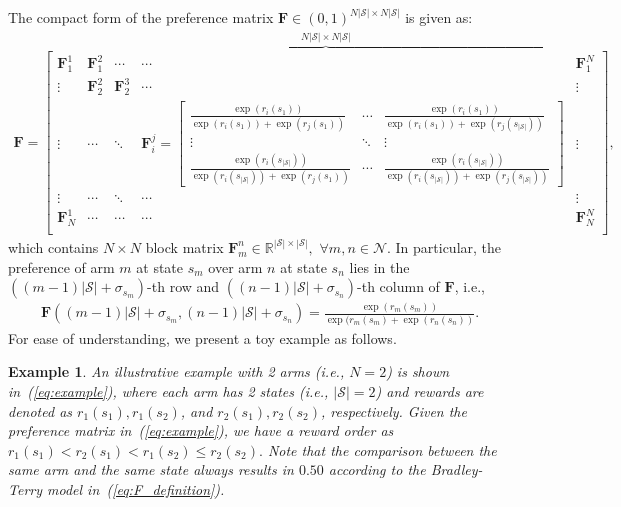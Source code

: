 \documentclass{article} %
\newcommand{\bF}{\mathbf{F}}
\newcommand{\cS}{\mathcal{S}}
\newcommand{\cN}{\mathcal{N}}
\newtheorem{exmp}{Example}
\begin{document}
{The compact form of the preference matrix $\bF\in(0,1)^{N|\cS|\times N|\cS|}$ is given as:
\begin{align*}
 \bF\!=\!  \overset{N|\cS|\times N|\cS|}{\overbrace{\left[\!\!
\begin{array}{c|c|c|c|c}
  \bF_1^1
        & \bF_1^2 &\cdots & \cdots & \bF_1^N\\
    \vdots & \bF_2^2 & \bF_2^3& \cdots & \vdots \\
     \vdots & \cdots &  \ddots & \bF_i^j\!=\!\left[\!\!\begin{array}{ccc}
         \frac{\exp(r_i(s_{1}))}{\exp(r_i(s_{1}))+\exp(r_j(s_{1}))}& \cdots &\frac{\exp(r_i(s_{1}))}{\exp(r_i(s_{1}))+\exp(r_j(s_{|\cS|}))} \\
         \vdots& \ddots & \vdots\\
         \frac{\exp(r_i(s_{|\cS|}))}{\exp(r_i(s_{|\cS|}))+\exp(r_j(s_{1}))}& \cdots& \frac{\exp(r_i(s_{|\cS|}))}{\exp(r_i(s_{|\cS|}))+\exp(r_j(s_{|\cS|}))}
    \end{array}\!\!\right] & \vdots \\
    \vdots& \cdots & \ddots & \cdots & \vdots \\
  \bF_N^1  & \cdots & \cdots & \cdots & \bF_{N}^N \\
\end{array}
\!\!\right] }},
\end{align*}
which contains $N\times N$ block matrix $\bF_m^n\in\mathbb{R}^{|\cS|\times|\cS|},$ $\forall m, n \in \cN$. In particular, the preference of arm $m$ at state $s_m$ over arm $n$ at state $s_n$ lies in the $((m-1)|\cS|+\sigma_{s_m})$-th row and $((n-1)|\cS|+\sigma_{s_n})$-th column of $\bF$, i.e.,
\begin{align}
    \bF((m-1)|\cS|+\sigma_{s_m}, (n-1)|\cS|+\sigma_{s_n})=\frac{\exp(r_m(s_m))}{\exp(r_m(s_m)+\exp(r_n(s_n))}.
\end{align}
For ease of understanding, we present a toy example as follows.

\begin{exmp}\label{example:1}
An illustrative example with 2 arms (i.e., $N=2$) is shown in~(\ref{eq:example}), where each arm has 2 states (i.e., $|\cS|=2$) and rewards are denoted as $r_1(s_1), r_1(s_2)$, and $r_2(s_1), r_2(s_2)$, respectively. Given the preference matrix in~(\ref{eq:example}), we have a reward order as $r_1(s_1)< r_2(s_1) < r_1(s_2) \leq r_2(s_2).$ Note that the comparison between the same arm and the same state always results in $0.50$ according to the Bradley-Terry model in~(\ref{eq:F_definition}).


\end{exmp}}
\end{document}
